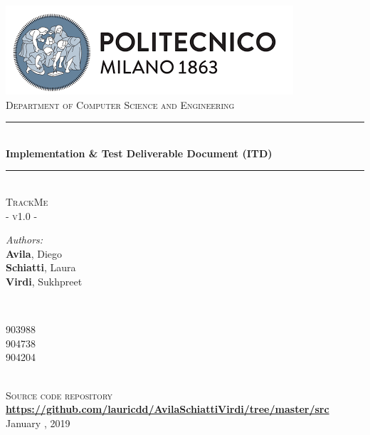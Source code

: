 \documentclass[a4paper, hidelinks, 12pt]{report}
\begin{document}
	\begin{titlepage}
		\centering
		\vspace*{0.7 cm}
		\includegraphics[scale = 0.85]{../Assets/PolimiLogo.png}\\[1.6 cm]
		\textsc{\large Department of Computer Science and Engineering}\\[1.8 cm]

		\rule{\linewidth}{0.2 mm} \\[0.4 cm]
		{ \huge \bfseries Implementation \& Test Deliverable Document (ITD)}\\
		\rule{\linewidth}{0.2 mm} \\[1.5 cm]

		\textsc{\Large TrackMe}\\[0.5 cm]
		\textsc{\large - v1.0 -}\\[1 cm]

		\begin{minipage}{0.4\textwidth}
			\begin{flushleft} \large
				\emph{Authors:}\\
				\textbf{Avila}, Diego \\
				\textbf{Schiatti}, Laura \\
				\textbf{Virdi}, Sukhpreet
			\end{flushleft}
		\end{minipage}~
		\begin{minipage}{0.4\textwidth}
			\begin{flushright} \large
				903988 \\
				904738 \\
				904204
			\end{flushright}
		\end{minipage}\\[2 cm]

		\textsc{\large Source code repository}
		\href{https://github.com/lauricdd/AvilaSchiattiVirdi/tree/backend/src}{\textbf{https://github.com/lauricdd/AvilaSchiattiVirdi/tree/master/src}}\\[1 cm]

		{\large January  , 2019}\\[2 cm]

		\vfill
	\end{titlepage}
\end{document}
